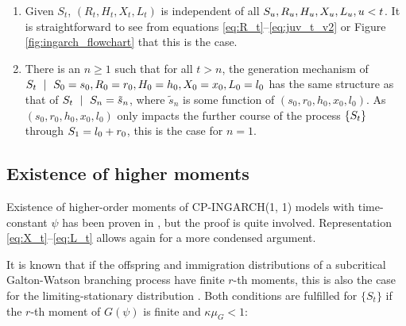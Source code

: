 \documentclass{article}
\begin{document}
\begin{enumerate}
\item Given $S_t$, $(R_t, H_t, X_t, L_t)$ is independent of all $S_u, R_u, H_u, X_u, L_u, u < t$. It is straightforward to see from equations \eqref{eq:R_t}--\eqref{eq:juv_t_v2} or Figure \ref{fig:ingarch_flowchart} that this is the case.
\item There is an $n \geq 1$ such that for all $t > n$, the generation mechanism of $\juv_t \ \mid \ \juv_0 = s_0, R_0 = r_0, H_0 = h_0, X_0 = x_0, L_0 = l_0$ has the same structure as that of $\juv_t \ \mid \ \juv_n = \tilde{s}_n$, where $\tilde{s}_n$ is some function of $(s_0, r_0, h_0, x_0, l_0)$. As $(s_0, r_0, h_0, x_0, l_0)$ only impacts the further course of the process $\{S_t\}$ through $S_1 = l_0 + r_0$, this is the case for $n = 1$. %
\end{enumerate}

\subsection{Existence of higher moments}

Existence of higher-order moments of CP-INGARCH(1, 1) models with time-constant $\psi$ has been proven in \cite{Silva2016}, but the proof is quite involved. Representation \eqref{eq:X_t}--\eqref{eq:L_t} allows again for a more condensed argument.

It is known that if the offspring and immigration distributions of a subcritical Galton-Watson branching process have finite $r$-th moments, this is also the case for the limiting-stationary distribution \cite[Sec. 4]{Lange1981}. Both conditions are fulfilled for $\{S_t\}$ if the $r$-th moment of $G(\psi)$ is finite and $\kappa\mu_G < 1$:
\end{document}
